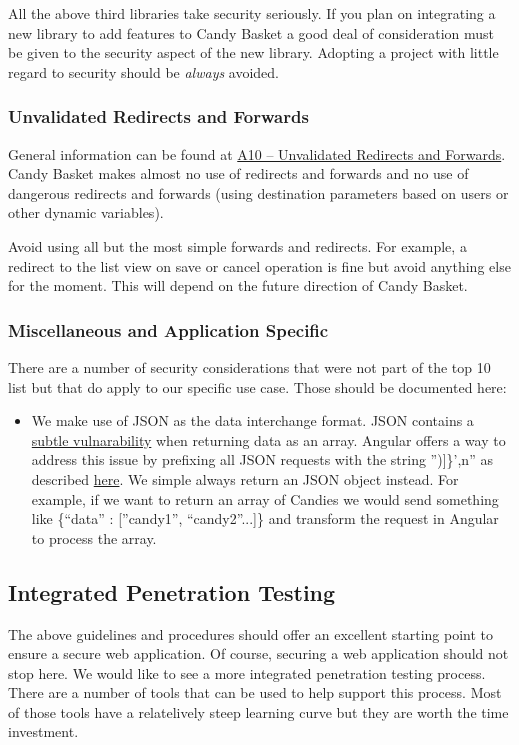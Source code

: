 \documentclass[letterpaper,10pt,english]{sphinxmanual}
\begin{document}
All the above third libraries take security seriously. If you plan on
integrating a new library to add features to Candy Basket a good deal
of consideration must be given to the security aspect of the new
library. Adopting a project with little regard to security should be
\emph{always} avoided.


\subsubsection{Unvalidated Redirects and Forwards}
\label{developer-guide:unvalidated-redirects-and-forwards}
General information can be found at \href{https://owasp.org/index.php/Top\_10\_2013-A10-Unvalidated\_Redirects\_and\_Forwards}{A10 -- Unvalidated Redirects and
Forwards}. Candy
Basket makes almost no use of redirects and forwards and no use of
dangerous redirects and forwards (using destination parameters based
on users or other dynamic variables).

Avoid using all but the most simple forwards and redirects. For
example, a redirect to the list view on save or cancel operation is
fine but avoid anything else for the moment. This will depend on the
future direction of Candy Basket.


\subsubsection{Miscellaneous and Application Specific}
\label{developer-guide:miscellaneous-and-application-specific}
There are a number of security considerations that were not part of
the top 10 list but that do apply to our specific use case. Those
should be documented here:
\begin{itemize}
\item {} 
We make use of JSON as the data interchange format. JSON contains a
\href{http://haacked.com/archive/2008/11/20/anatomy-of-a-subtle-json-vulnerability.aspx}{subtle vulnarability}
when returning data as an array. Angular offers a way to address
this issue by prefixing all JSON requests with the string ''){]}\}',n''
as described \href{http://docs.angularjs.org/api/ng/service/\$http}{here}. We simple always
return an JSON object instead. For example, if we want to return an
array of Candies we would send something like \{``data'' : {[}''candy1'',
``candy2''...{]}\} and transform the request in Angular to process the
array.

\end{itemize}


\subsection{Integrated Penetration Testing}
\label{developer-guide:integrated-penetration-testing}
The above guidelines and procedures should offer an excellent starting
point to ensure a secure web application. Of course, securing a web
application should not stop here. We would like to see a more
integrated penetration testing process. There are a number of tools
that can be used to help support this process. Most of those tools
have a relatelively steep learning curve but they are worth the time
investment.
\end{document}
